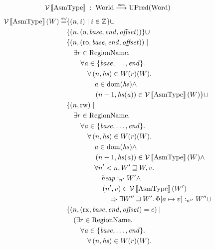 \documentclass{article}
\newcommand{\update}[2]{[#1 \mapsto #2]}%
\newcommand{\sem}[1]{\left\llbracket #1 \right\rrbracket}
\newcommand{\monfun}{\stackrel{\textit{\tiny{mon}}}{\longrightarrow}}
\newcommand{\defeq}{\stackrel{\textit{\tiny{def}}}{=}}
\newcommand{\union}{\mathbin{\cup}}
\DeclareMathOperator{\dom}{dom}
\newcommand{\var}[1]{\mathit{#1}}
\newcommand{\addr}{\var{a}}
\newcommand{\offset}{\var{offset}}
\newcommand{\start}{\var{base}}
\newcommand{\addrend}{\var{end}}
\newcommand{\heapseg}{\var{hs}}
\newcommand{\heap}{\var{heap}}
\newcommand{\perm}{\var{perm}}
\newcommand{\stdcap}[1][\perm]{\left(#1,\start,\addrend,\offset \right)}
\newcommand{\future}{\mathbin{\sqsupseteq}}
\newcommand{\heapSat}[3][\heap]{#1 :_{#2} #3}
\newcommand{\asmType}{\plaindom{AsmType}}
\newcommand{\plaindom}[1]{\mathrm{#1}}
\newcommand{\Words}{\plaindom{Word}}
\newcommand{\ints}{\mathbb{Z}}
\newcommand{\RegionName}{\plaindom{RegionName}}
\newcommand{\Worlds}{\plaindom{World}}
\newcommand{\UPred}[1]{\plaindom{UPred}(#1)}
\newcommand{\intr}[2]{\mathcal{#1}\sem{#2}}
\newcommand{\valueintr}[1]{\intr{V}{#1}}
\newcommand{\stdvr}{\valueintr{\asmType}}
\newcommand{\npair}[2][n]{\left(#1,#2 \right)}
\newcommand{\plainperm}[1]{\mathrm{#1}}
\newcommand{\noperm}{\plainperm{o}}
\newcommand{\readonly}{\plainperm{ro}}
\newcommand{\readwrite}{\plainperm{rw}}
\newcommand{\exec}{\plainperm{rx}}
\begin{document}
\[
\stdvr \; : \;  \Worlds \monfun \UPred{\Words}
\]
\begin{align*}
  \stdvr(W) \defeq & \{ \npair{i} \mid i \in \ints \} 
\union \\
                   & \{ \npair{\stdcap[\noperm] } \} 
\union \\
                   & \{ \npair{\stdcap[\readonly]} \mid \\
                   & \quad \exists r \in \RegionName \ldotp \\
                   & \qquad  \forall \addr \in \{\start, \dots, \addrend \} \ldotp \\
                   & \qquad \quad  \forall \npair{\heapseg} \in W(r)(W)\ldotp \\
                   & \qquad \qquad   \addr \in \dom(\heapseg) \land \\
                   & \qquad \qquad   \npair[n-1]{\heapseg(\addr)} \in \stdvr(W)\} 
\union \\
                   & \{ \npair{\readwrite} \mid \\
                   & \quad \exists r \in \RegionName \ldotp \\
                   & \qquad  \forall \addr \in \{\start, \dots, \addrend \} \ldotp \\
                   & \qquad \quad  \forall \npair{\heapseg} \in W(r)(W)\ldotp \\
                   & \qquad \qquad   \addr \in \dom(\heapseg) \land \\
                   & \qquad \qquad   \npair[n-1]{\heapseg(\addr)} \in \stdvr(W) \land \\
                   & \qquad \qquad   \forall n' < n, W' \future W, v \ldotp \\
                   & \qquad \qquad \quad \heapSat{n'}{W'} \land \\
                   & \qquad \qquad \quad \npair[n']{v} \in \stdvr(W') \\
                   & \qquad \qquad \qquad  \Rightarrow \exists W'' \future W' \ldotp \heapSat[\Phi\update{a}{v}]{n''}{W''}
\union \\
                   & \{ \npair{\stdcap[\exec] = c} \mid \\
                   & \quad (\exists r \in \RegionName \ldotp \\
                   & \qquad  \forall \addr \in \{\start, \dots, \addrend \} \ldotp \\
                   & \qquad \quad  \forall \npair{\heapseg} \in W(r)(W)\ldotp \\

\end{align*}
\end{document}
